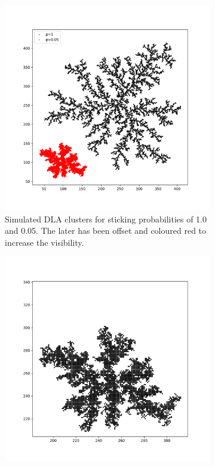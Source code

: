 \documentclass[%
 aapm,
 mph,%
 amsmath,amssymb,
 reprint,%
]{revtex4-2}
\begin{document}
\begin{figure}[ht]
\begin{subfigure}{0.45\linewidth}
\centering
\includegraphics[width=1.0\linewidth]{figures/3.png}
\caption{\label{fig:DLA1,0.05}Simulated DLA clusters for sticking probabilities of 1.0 and 0.05. The later has been offset and coloured red to increase the visibility.}
\end{subfigure}
\begin{subfigure}{0.45\linewidth}
\centering
\includegraphics[width=1.0\linewidth]{figures/4.png}

\end{subfigure}
\end{figure}
\end{document}
